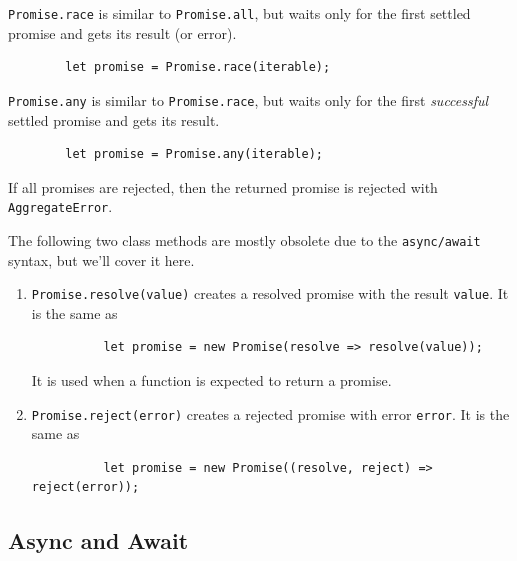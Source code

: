 \documentclass{article}
\newcounter{definition}[section]
\begin{document}
    \begin{definition}
      \label{def:promise-race}
      \texttt{Promise.race} is similar to \texttt{Promise.all}, but waits only for the first settled promise and gets its result (or error). 
      \begin{lstlisting}
        let promise = Promise.race(iterable); 
      \end{lstlisting}
    \end{definition}

    \begin{definition}
      \label{def:promise-any}
      \texttt{Promise.any} is similar to \texttt{Promise.race}, but waits only for the first \textit{successful} settled promise and gets its result. 
      \begin{lstlisting}
        let promise = Promise.any(iterable); 
      \end{lstlisting}
      If all promises are rejected, then the returned promise is rejected with \texttt{AggregateError}. 
    \end{definition}


    \begin{definition}
      \label{def:promise-resolve-promise-reject}
      The following two class methods are mostly obsolete due to the \texttt{async/await} syntax, but we'll cover it here. 
      \begin{enumerate}
        \item \texttt{Promise.resolve(value)} creates a resolved promise with the result \texttt{value}. It is the same as 
        \begin{lstlisting}
          let promise = new Promise(resolve => resolve(value));
        \end{lstlisting}
        It is used when a function is expected to return a promise.

        \item \texttt{Promise.reject(error)} creates a rejected promise with error \texttt{error}. It is the same as 
        \begin{lstlisting}
          let promise = new Promise((resolve, reject) => reject(error));
        \end{lstlisting}
      \end{enumerate}
    \end{definition}

  \subsection{Async and Await}
\end{document}
